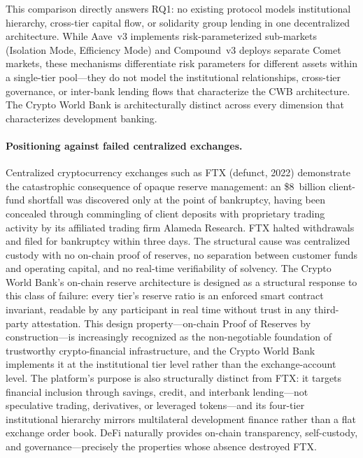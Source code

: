 \documentclass[12pt,a4paper]{report}
\begin{document}
This comparison directly answers RQ1: no existing protocol models institutional hierarchy, cross-tier capital flow, or solidarity group lending in one decentralized architecture. While Aave~v3 implements risk-parameterized sub-markets (Isolation Mode, Efficiency Mode) and Compound~v3 deploys separate Comet markets, these mechanisms differentiate risk parameters for different assets within a single-tier pool---they do not model the institutional relationships, cross-tier governance, or inter-bank lending flows that characterize the CWB architecture. The Crypto World Bank is architecturally distinct across every dimension that characterizes development banking.

\paragraph{Positioning against failed centralized exchanges.}
Centralized cryptocurrency exchanges such as FTX (defunct, 2022) demonstrate the catastrophic consequence of opaque reserve management: an \$8~billion client-fund shortfall was discovered only at the point of bankruptcy, having been concealed through commingling of client deposits with proprietary trading activity by its affiliated trading firm Alameda Research. FTX halted withdrawals and filed for bankruptcy within three days. The structural cause was centralized custody with no on-chain proof of reserves, no separation between customer funds and operating capital, and no real-time verifiability of solvency. The Crypto World Bank's on-chain reserve architecture is designed as a structural response to this class of failure: every tier's reserve ratio is an enforced smart contract invariant, readable by any participant in real time without trust in any third-party attestation. This design property---on-chain Proof of Reserves by construction---is increasingly recognized as the non-negotiable foundation of trustworthy crypto-financial infrastructure, and the Crypto World Bank implements it at the institutional tier level rather than the exchange-account level. The platform's purpose is also structurally distinct from FTX: it targets financial inclusion through savings, credit, and interbank lending---not speculative trading, derivatives, or leveraged tokens---and its four-tier institutional hierarchy mirrors multilateral development finance rather than a flat exchange order book. DeFi naturally provides on-chain transparency, self-custody, and governance---precisely the properties whose absence destroyed FTX.
\end{document}
